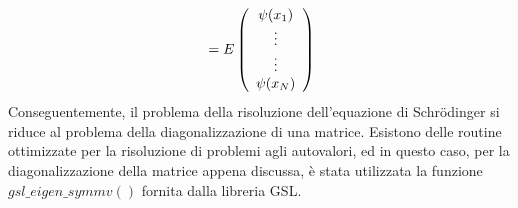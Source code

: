 \documentclass[11pt,a4paper]{article}
\begin{document}
\[
\\ 
 = E\left( \begin{array}{c}
\psi(x_1) \\ \vdots \\ \vdots \\ \psi(x_N)
\end{array} \right)
\]
Conseguentemente, il problema della risoluzione dell'equazione di Schr\"{o}dinger si riduce al problema della diagonalizzazione di una matrice. Esistono delle routine ottimizzate per la risoluzione di problemi agli autovalori, ed in questo caso, per la diagonalizzazione della matrice appena discussa, è stata utilizzata la funzione $gsl\_eigen\_symmv()$ fornita dalla libreria GSL. 
\end{document}
